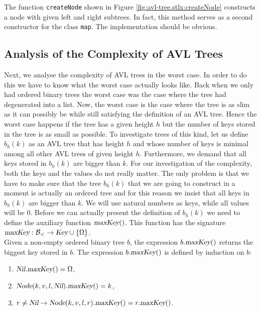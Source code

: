 The function \texttt{createNode} shown in Figure \ref{fig:avl-tree.stlx:createNode}
constructs a node with given left and right subtrees.  In fact, this method serves as a second
constructor for the class \texttt{map}.  The implementation should be obvious.


\subsection{Analysis of the Complexity of AVL Trees}
Next, we analyse the complexity of AVL trees in the worst case.  In order to do this we have to know
what the worst case actually looks like.  Back when we only had ordered binary trees the worst case was the case where
the tree had degenerated into a list.  Now, the worst case is the case where the tree is as slim as
it can possibly be while still satisfying the definition of an AVL tree.  Hence the worst case
happens if the tree has a given height $h$ but the number of keys stored in the tree is as small as
possible.  To investigate trees of this kind, let us define  $b_h(k)$ as an AVL tree that has height
$h$ and whose number of keys is minimal among all other AVL trees of given  height $h$.  Furthermore,
we demand that all keys stored in  $b_h(k)$ are bigger than  $k$.  For our investigation of the
complexity, both the keys and the values do not really matter.  The only problem is that we have to
make sure that the tree $b_h(k)$ that we are going to construct in a moment is actually an ordered
tree and for this reason we insist that all keys in $b_h(k)$ are bigger than $k$.  We will use
natural numbers as keys, while all values will be $0$.
Before we can actually present the definition of  $b_h(k)$ we need to define the auxiliary function
 $\textsl{maxKey}()$.  This function has the signature 
\\[0.2cm]
\hspace*{1.3cm}
$\textsl{maxKey}:\mathcal{B}_< \rightarrow \textsl{Key} \cup \{ \Omega \}$.
\\[0.2cm]
Given a non-empty ordered binary tree  $b$, the expression $b.\textsl{maxKey}()$ returns the biggest
key stored in $b$.  The expression  $b.\textsl{maxKey}()$ is defined by induction on $b$:
\begin{enumerate}
\item $\textsl{Nil}.\textsl{maxKey}() = \Omega$,
\item $\textsl{Node}(k,v,l,\textsl{Nil}).\textsl{maxKey}() = k$,
\item $r \not= \textsl{Nil} \rightarrow \textsl{Node}(k,v,l,r).\textsl{maxKey}() = r.\textsl{maxKey}()$.
\end{enumerate}
